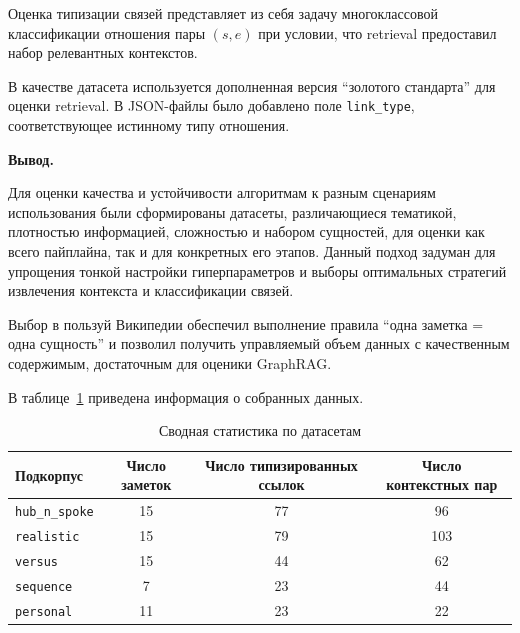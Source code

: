 Оценка типизации связей представляет из себя задачу многоклассовой классификации
отношения пары \((s,e)\)
при условии, что retrieval предоставил набор релевантных контекстов.

В качестве датасета используется дополненная версия ``золотого стандарта'' для оценки retrieval.
В JSON-файлы было добавлено поле \texttt{link\_type}, соответствующее истинному типу отношения.

\textbf{Вывод.}

Для оценки качества и устойчивости алгоритмам к разным сценариям использования были сформированы
датасеты, различающиеся тематикой, плотностью информацией, сложностью и набором сущностей,
для оценки как всего пайплайна, так и для конкретных его этапов.
Данный подход задуман для упрощения тонкой настройки гиперпараметров и
выборы оптимальных стратегий извлечения контекста и классификации связей.

Выбор в пользуй Википедии обеспечил выполнение правила ``одна заметка = одна сущность''
и позволил получить управляемый объем данных с качественным содержимым, достаточным для оценики GraphRAG.

В таблице~\ref{tab:dataset_samples} приведена информация о собранных данных.

\begin{table}[H]
      \centering
      \caption{Сводная статистика по датасетам}
      \label{tab:dataset_samples}
      \begin{tabular}{lccc}
            \hline
            Подкорпус              & Число заметок & Число типизированных ссылок & Число контекстных пар \\
            \hline
            \texttt{hub\_n\_spoke} & 15            & 77                          & 96                    \\
            \texttt{realistic}     & 15            & 79                          & 103                   \\
            \texttt{versus}        & 15            & 44                          & 62                    \\
            \texttt{sequence}      & 7             & 23                          & 44                    \\
            \texttt{personal}      & 11            & 23                          & 22                    \\
            \hline
      \end{tabular}
\end{table}



